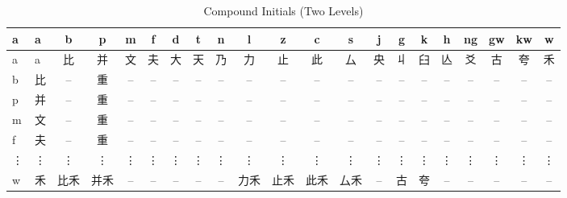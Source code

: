 \documentclass[a5paper, 12pt, openany]{book} %
\begin{document}
\begin{landscape} %
  \begin{table}[h]
    \centering
    \caption{Compound Initials (Two Levels)}
    \label{tab:compound_initials} %
    \setlength{\tabcolsep}{4pt} %
    \begin{tabular}{@{}llccccccccccccccccccc@{}}
      \hline
      \textbf{a} & \textbf{a} & \textbf{b} & \textbf{p} & \textbf{m} & \textbf{f} & \textbf{d} & \textbf{t} & \textbf{n} & \textbf{l} & \textbf{z} & \textbf{c} & \textbf{s} & \textbf{j} & \textbf{g} & \textbf{k} & \textbf{h} & \textbf{ng} & \textbf{gw} & \textbf{kw} & \textbf{w} \\
      \hline
      a & a & 比 & 并 & 文 & 夫 & 大 & 天 & 乃 & 力 & 止 & 此 & 厶 & 央 & 丩 & 臼 & 亾 & 爻 & 古 & 夸 & 禾 \\
      b & 比 & -- & 重 & -- & -- & -- & -- & -- & -- & -- & -- & -- & -- & -- & -- & -- & -- & -- & -- & -- \\
      p & 并 & -- & 重 & -- & -- & -- & -- & -- & -- & -- & -- & -- & -- & -- & -- & -- & -- & -- & -- & -- \\
      m & 文 & -- & 重 & -- & -- & -- & -- & -- & -- & -- & -- & -- & -- & -- & -- & -- & -- & -- & -- & -- \\
      f & 夫 & -- & 重 & -- & -- & -- & -- & -- & -- & -- & -- & -- & -- & -- & -- & -- & -- & -- & -- & -- \\
      \vdots & \vdots & \vdots & \vdots & \vdots & \vdots & \vdots & \vdots & \vdots & \vdots & \vdots & \vdots & \vdots & \vdots & \vdots & \vdots & \vdots & \vdots & \vdots & \vdots & \vdots \\
      w & 禾 & 比禾 & 并禾 & -- & -- & -- & -- & -- & 力禾 & 止禾 & 此禾 & 厶禾 & -- & 古 & 夸 & -- & -- & -- & -- & -- \\
      \hline
    \end{tabular}
  \end{table}
  \end{landscape}
  
\end{document}
